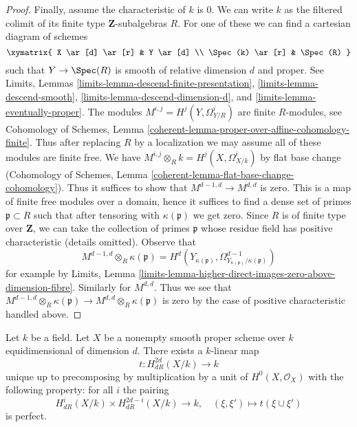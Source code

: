 \begin{proof}
\medskip\noindent
Finally, assume the characteristic of $k$ is $0$.
We can write $k$ as the filtered colimit of its finite type
$\mathbf{Z}$-subalgebras $R$. For one of these we can find a
cartesian diagram of schemes
$$
\xymatrix{
X \ar[d] \ar[r] & Y \ar[d] \\
\Spec(k) \ar[r] & \Spec(R)
}
$$
such that $Y \to \Spec(R)$ is smooth of relative dimension $d$ and proper.
See Limits, Lemmas \ref{limits-lemma-descend-finite-presentation},
\ref{limits-lemma-descend-smooth}, \ref{limits-lemma-descend-dimension-d}, and
\ref{limits-lemma-eventually-proper}.
The modules $M^{i, j} = H^j(Y, \Omega^i_{Y/R})$ are finite $R$-modules, see
Cohomology of Schemes, Lemma
\ref{coherent-lemma-proper-over-affine-cohomology-finite}.
Thus after replacing $R$ by a localization we may assume all of these
modules are finite free. We have
$M^{i, j} \otimes_R k = H^j(X, \Omega^i_{X/k})$
by flat base change (Cohomology of Schemes, Lemma
\ref{coherent-lemma-flat-base-change-cohomology}).
Thus it suffices to show that $M^{d - 1, d} \to M^{d, d}$
is zero. This is a map of finite free modules over a domain,
hence it suffices to find a dense set of primes $\mathfrak p \subset R$
such that after tensoring with $\kappa(\mathfrak p)$ we get zero.
Since $R$ is of finite type over $\mathbf{Z}$, we can take
the collection of primes $\mathfrak p$ whose residue field
has positive characteristic (details omitted). Observe that
$$
M^{d - 1, d} \otimes_R \kappa(\mathfrak p) =
H^d(Y_{\kappa(\mathfrak p)},
\Omega^{d - 1}_{Y_{\kappa(\mathfrak p)}/\kappa(\mathfrak p)})
$$
for example by Limits, Lemma
\ref{limits-lemma-higher-direct-images-zero-above-dimension-fibre}.
Similarly for $M^{d, d}$. Thus we see that
$M^{d - 1, d} \otimes_R \kappa(\mathfrak p) \to
M^{d, d} \otimes_R \kappa(\mathfrak p)$
is zero by the case of positive characteristic handled above.
\end{proof}

\begin{proposition}
\label{proposition-poincare-duality}
Let $k$ be a field. Let $X$ be a nonempty smooth proper scheme over $k$
equidimensional of dimension $d$. There exists a $k$-linear map
$$
t : H^{2d}_{dR}(X/k) \longrightarrow k
$$
unique up to precomposing by multiplication by a unit of
$H^0(X, \mathcal{O}_X)$ with the following property: for all $i$ the pairing
$$
H^i_{dR}(X/k) \times H_{dR}^{2d - i}(X/k)
\longrightarrow
k, \quad
(\xi, \xi') \longmapsto t(\xi \cup \xi')
$$
is perfect.
\end{proposition}

